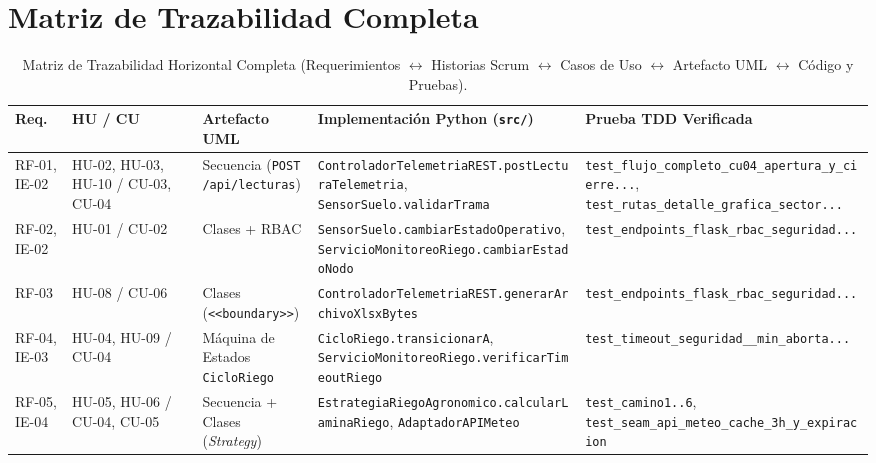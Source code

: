 \documentclass[11pt,letterpaper]{report}
\begin{document}
\section{Matriz de Trazabilidad Completa}
\begin{table}[H]
\centering
\caption{Matriz de Trazabilidad Horizontal Completa (Requerimientos $\leftrightarrow$ Historias Scrum $\leftrightarrow$ Casos de Uso $\leftrightarrow$ Artefacto UML $\leftrightarrow$ Código y Pruebas).}
\label{tab:trazabilidad}
\scriptsize
\begin{tabularx}{\textwidth}{L{1.5cm} L{2.1cm} L{2.7cm} L{4.7cm} Y}
\toprule
\textbf{Req.} & \textbf{HU / CU} & \textbf{Artefacto UML} & \textbf{Implementación Python (\texttt{src/})} & \textbf{Prueba TDD Verificada} \\
\midrule
RF-01, IE-02 & HU-02, HU-03, HU-10 / CU-03, CU-04 & Secuencia (\texttt{POST /api/\allowbreak lecturas}) & \texttt{ControladorTelemetriaREST.\allowbreak postLecturaTelemetria}, \texttt{SensorSuelo.\allowbreak validarTrama} & \texttt{test\_\allowbreak flujo\_\allowbreak completo\_\allowbreak cu04\_\allowbreak apertura\_\allowbreak y\_\allowbreak cierre...}, \texttt{test\_\allowbreak rutas\_\allowbreak detalle\_\allowbreak grafica\_\allowbreak sector...} \\
RF-02, IE-02 & HU-01 / CU-02 & Clases + RBAC & \texttt{SensorSuelo.\allowbreak cambiarEstadoOperativo}, \texttt{ServicioMonitoreoRiego.\allowbreak cambiarEstadoNodo} & \texttt{test\_\allowbreak endpoints\_\allowbreak flask\_\allowbreak rbac\_\allowbreak seguridad...} \\
RF-03 & HU-08 / CU-06 & Clases (\texttt{<<boundary>>}) & \texttt{ControladorTelemetriaREST.\allowbreak generarArchivoXlsxBytes} & \texttt{test\_\allowbreak endpoints\_\allowbreak flask\_\allowbreak rbac\_\allowbreak seguridad...} \\
RF-04, IE-03 & HU-04, HU-09 / CU-04 & Máquina de Estados \texttt{CicloRiego} & \texttt{CicloRiego.\allowbreak transicionarA}, \texttt{ServicioMonitoreoRiego.\allowbreak verificarTimeoutRiego} & \texttt{test\_\allowbreak timeout\_\allowbreak seguridad\_\_\allowbreak min\_\allowbreak aborta...} \\
RF-05, IE-04 & HU-05, HU-06 / CU-04, CU-05 & Secuencia + Clases (\textit{Strategy}) & \texttt{EstrategiaRiegoAgronomico.\allowbreak calcularLaminaRiego}, \texttt{AdaptadorAPIMeteo} & \texttt{test\_\allowbreak camino1..6}, \texttt{test\_\allowbreak seam\_\allowbreak api\_\allowbreak meteo\_\allowbreak cache\_\allowbreak 3h\_\allowbreak y\_\allowbreak expiracion} \\

\end{tabularx}
\end{table}
\end{document}
